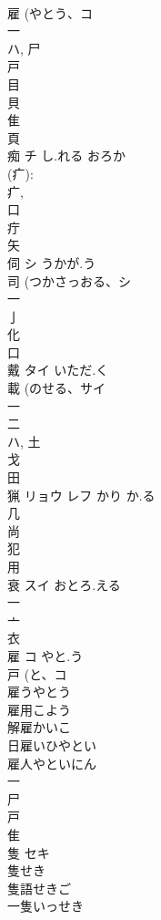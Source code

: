 \documentclass[8pt]{extreport}
\begin{document}
\begin{CJK}{UTF8}{min}
\\	雇 (やとう、コ 
\\	一 
\\	ハ, 尸 
\\	戸 
\\	目 
\\	貝 
\\	隹 
\\	頁 
\\	痴	チ	し.れる おろか	
\\	(疒): 
\\	疒, 
\\	口 
\\	疔 
\\	矢 
\\	伺	シ	うかが.う	
\\	司 (つかさっおる、シ 
\\	一 
\\	亅 
\\	化 
\\	口 
\\	戴	タイ	いただ.く	
\\	載 (のせる、サイ 
\\	一 
\\	二 
\\	ハ, 土 
\\	戈 
\\	田 
\\	猟	リョウ レフ	かり か.る	
\\	几 
\\	尚 
\\	犯 
\\	用 
\\	衰	スイ	おとろ.える	
\\	一 
\\	亠 
\\	衣 
\\	雇	コ	やと.う	
\\	戸 (と、コ 
\\	雇うやとう 
\\	雇用こよう 
\\	解雇かいこ 
\\	日雇いひやとい 
\\	雇人やといにん 
\\	一 
\\	尸 
\\	戸 
\\	隹 
\\	隻	セキ		
\\	隻せき
\\	隻語せきご
\\	一隻いっせき

\end{CJK}
\end{document}
